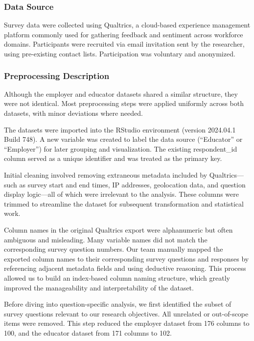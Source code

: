 \documentclass[
  11pt,
  letterpaper,
  DIV=11,
  numbers=noendperiod]{scrartcl}
\begin{document}
\subsubsection{Data Source}\label{data-source}

Survey data were collected using Qualtrics, a cloud-based experience
management platform commonly used for gathering feedback and sentiment
across workforce domains. Participants were recruited via email
invitation sent by the researcher, using pre-existing contact lists.
Participation was voluntary and anonymized.

\subsubsection{Preprocessing
Description}\label{preprocessing-description}

Although the employer and educator datasets shared a similar structure,
they were not identical. Most preprocessing steps were applied uniformly
across both datasets, with minor deviations where needed.

The datasets were imported into the RStudio environment (version
2024.04.1 Build 748). A new variable was created to label the data
source (``Educator'' or ``Employer'') for later grouping and
visualization. The existing respondent\_id column served as a unique
identifier and was treated as the primary key.

Initial cleaning involved removing extraneous metadata included by
Qualtrics---such as survey start and end times, IP addresses,
geolocation data, and question display logic---all of which were
irrelevant to the analysis. These columns were trimmed to streamline the
dataset for subsequent transformation and statistical work.

Column names in the original Qualtrics export were alphanumeric but
often ambiguous and misleading. Many variable names did not match the
corresponding survey question numbers. Our team manually mapped the
exported column names to their corresponding survey questions and
responses by referencing adjacent metadata fields and using deductive
reasoning. This process allowed us to build an index-based column naming
structure, which greatly improved the manageability and interpretability
of the dataset.

Before diving into question-specific analysis, we first identified the
subset of survey questions relevant to our research objectives. All
unrelated or out-of-scope items were removed. This step reduced the
employer dataset from 176 columns to 100, and the educator dataset from
171 columns to 102.
\end{document}
